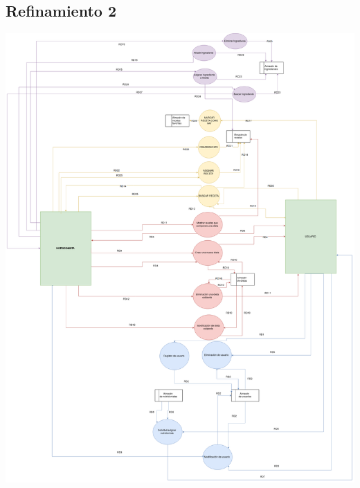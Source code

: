 \documentclass[12pt,letterpaper]{article}
\begin{document}
\subsection{Refinamiento 2}
\includegraphics[scale=0.3]{Refinamiento_2.png}
\end{document}
